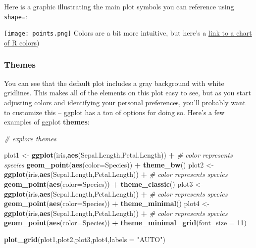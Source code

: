 \documentclass[
]{article}
\newenvironment{Shaded}{\begin{snugshade}}{\end{snugshade}}
\newcommand{\AttributeTok}[1]{\textcolor[rgb]{0.13,0.29,0.53}{#1}}
\newcommand{\CommentTok}[1]{\textcolor[rgb]{0.56,0.35,0.01}{\textit{#1}}}
\newcommand{\DecValTok}[1]{\textcolor[rgb]{0.00,0.00,0.81}{#1}}
\newcommand{\FunctionTok}[1]{\textcolor[rgb]{0.13,0.29,0.53}{\textbf{#1}}}
\newcommand{\NormalTok}[1]{#1}
\newcommand{\OtherTok}[1]{\textcolor[rgb]{0.56,0.35,0.01}{#1}}
\newcommand{\SpecialCharTok}[1]{\textcolor[rgb]{0.81,0.36,0.00}{\textbf{#1}}}
\newcommand{\StringTok}[1]{\textcolor[rgb]{0.31,0.60,0.02}{#1}}
\begin{document}
Here is a graphic illustrating the main plot symbols you can reference
using \texttt{shape=}:

\texttt{[image: points.png]} Colors are a bit more intuitive, but here's
a \href{http://www.stat.columbia.edu/~tzheng/files/Rcolor.pdf}{link to a
chart of R colors})

\hypertarget{themes}{%
\subsubsection{Themes}\label{themes}}

You can see that the default plot includes a gray background with white
gridlines. This makes all of the elements on this plot easy to see, but
as you start adjusting colors and identifying your personal preferences,
you'll probably want to customize this -- ggplot has a ton of options
for doing so. Here's a few examples of ggplot \textbf{themes}:

\begin{Shaded}
\begin{Highlighting}[]
\CommentTok{\# explore themes }

\NormalTok{plot1 }\OtherTok{\textless{}{-}} \FunctionTok{ggplot}\NormalTok{(iris,}\FunctionTok{aes}\NormalTok{(Sepal.Length,Petal.Length)) }\SpecialCharTok{+}    \CommentTok{\# color represents species}
  \FunctionTok{geom\_point}\NormalTok{(}\FunctionTok{aes}\NormalTok{(}\AttributeTok{color=}\NormalTok{Species)) }\SpecialCharTok{+}
  \FunctionTok{theme\_bw}\NormalTok{()}
\NormalTok{plot2 }\OtherTok{\textless{}{-}} \FunctionTok{ggplot}\NormalTok{(iris,}\FunctionTok{aes}\NormalTok{(Sepal.Length,Petal.Length)) }\SpecialCharTok{+}    \CommentTok{\# color represents species}
  \FunctionTok{geom\_point}\NormalTok{(}\FunctionTok{aes}\NormalTok{(}\AttributeTok{color=}\NormalTok{Species)) }\SpecialCharTok{+}
  \FunctionTok{theme\_classic}\NormalTok{()}
\NormalTok{plot3 }\OtherTok{\textless{}{-}} \FunctionTok{ggplot}\NormalTok{(iris,}\FunctionTok{aes}\NormalTok{(Sepal.Length,Petal.Length)) }\SpecialCharTok{+}    \CommentTok{\# color represents species}
  \FunctionTok{geom\_point}\NormalTok{(}\FunctionTok{aes}\NormalTok{(}\AttributeTok{color=}\NormalTok{Species)) }\SpecialCharTok{+}
  \FunctionTok{theme\_minimal}\NormalTok{()}
\NormalTok{plot4 }\OtherTok{\textless{}{-}} \FunctionTok{ggplot}\NormalTok{(iris,}\FunctionTok{aes}\NormalTok{(Sepal.Length,Petal.Length)) }\SpecialCharTok{+}    \CommentTok{\# color represents species}
  \FunctionTok{geom\_point}\NormalTok{(}\FunctionTok{aes}\NormalTok{(}\AttributeTok{color=}\NormalTok{Species)) }\SpecialCharTok{+}
  \FunctionTok{theme\_minimal\_grid}\NormalTok{(}\AttributeTok{font\_size =} \DecValTok{11}\NormalTok{)}

\FunctionTok{plot\_grid}\NormalTok{(plot1,plot2,plot3,plot4,}\AttributeTok{labels =} \StringTok{"AUTO"}\NormalTok{)}
\end{Highlighting}
\end{Shaded}
\end{document}
